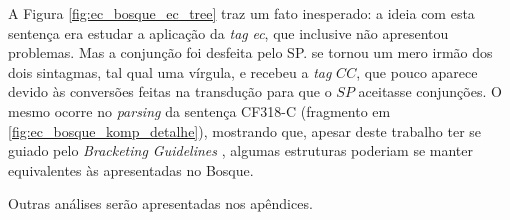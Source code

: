 A Figura \ref{fig:ec_bosque_ec_tree}
traz um fato inesperado: a ideia com esta sentença era estudar a aplicação da \textit{tag} \textit{ec}, que inclusive não apresentou problemas. Mas a conjunção  foi desfeita pelo SP.  se tornou um mero irmão dos dois sintagmas, tal qual uma vírgula, e recebeu a \textit{tag} $CC$, que pouco aparece devido às conversões feitas na transdução para que o $SP$ aceitasse conjunções. O mesmo ocorre no \textit{parsing} da sentença CF318-C (fragmento em \ref{fig:ec_bosque_komp_detalhe}), mostrando que, apesar deste trabalho ter se guiado pelo \textit{Bracketing Guidelines} \cite{bracketing_ptb}, algumas estruturas poderiam se manter equivalentes às apresentadas no Bosque.

Outras análises serão apresentadas nos apêndices.